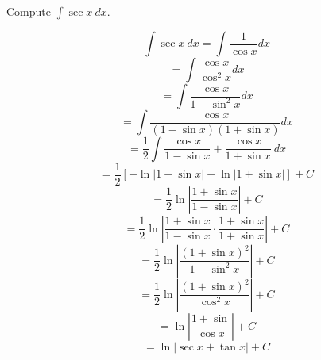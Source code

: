 \begin{questions}
\question[10] Compute $\int \sec x\ dx$.
\begin{solution}
    $$\int \sec x\ dx = \int \frac{1}{\cos x}dx$$
    $$ = \int \frac{\cos x}{\cos^2 x}dx$$
    $$ = \int \frac{\cos x}{1 - \sin^2 x}dx$$
    $$ = \int \frac{\cos x}{(1 - \sin x)(1 + \sin x)} dx$$
    $$ = \frac{1}{2}\int \frac{\cos x}{1 - \sin x} + \frac{\cos x}{1
    + \sin x}\ dx$$
    $$ = \frac{1}{2}[-\ln|1 - \sin x| + \ln|1 + \sin x|] + C$$
    $$ = \frac{1}{2}\ln |\frac{1 + \sin x}{1 - \sin x}| + C$$
    $$ = \frac{1}{2}\ln |\frac{1 + \sin x}{1 - \sin x} \cdot \frac{1 + \sin x}{1 + \sin x}| + C$$
    $$ = \frac{1}{2}\ln |\frac{(1 + \sin x)^2}{1 - \sin^2 x}| + C$$
    $$ = \frac{1}{2}\ln |\frac{(1 + \sin x)^2}{\cos^2 x}| + C$$
    $$ = \ln |\frac{1 + \sin }{\cos x}| + C$$
    $$ = \ln |\sec x + \tan x| + C$$
\end{solution}




\end{questions}
